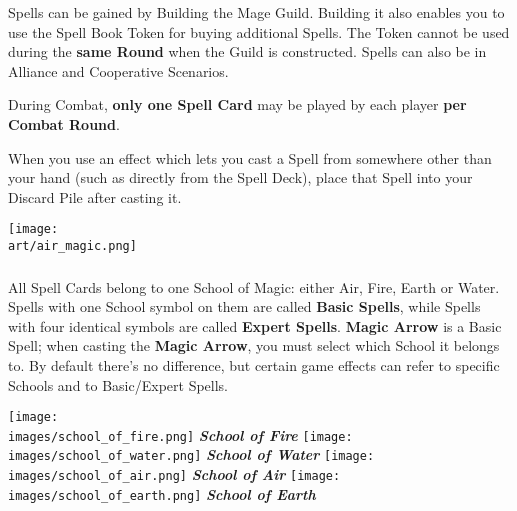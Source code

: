 \begin{multicols*}{2}
Spells can be gained by Building the Mage Guild.
Building it also enables you to use the Spell Book Token for buying additional Spells.
The Token cannot be used during the \textbf{same Round} when the Guild is constructed. Spells can also be  in Alliance and Cooperative Scenarios.

During Combat, \textbf{only one Spell Card} may be played by each player \textbf{per Combat Round}.

\columnbreak
When you use an effect which lets you cast a Spell from somewhere other than your hand (such as directly from the Spell Deck), place that Spell into your Discard Pile after casting it.

\begin{center}
  \vspace*{\fill}
  {\texttt{[image: \\art/air\_magic.png]}}
  \vspace*{\fill}
\end{center}

\subsubsection*{}
All Spell Cards belong to one School of Magic: either Air, Fire, Earth or Water.
Spells with one School symbol on them are called \textbf{Basic Spells}, while Spells with four identical symbols are called \textbf{Expert Spells}.
\textbf{Magic Arrow} is a Basic Spell; when casting the \textbf{Magic Arrow}, you must select which School it belongs to.
By default there's no difference, but certain game effects can refer to specific Schools and to Basic/Expert Spells.

\begin{minipage}[t]{0.48\textwidth}
  \centering
    \centering
    \texttt{[image: \\images/school\_of\_fire.png]}
    \textit{\textbf{\textcolor{darkcandyapplered}{School of Fire}}}
  \endminipage
    \centering
    \texttt{[image: \\images/school\_of\_water.png]}
    \textit{\textbf{\textcolor{darkcandyapplered}{School of Water}}}
  \endminipage
  \hfill\allowbreak%
  \bigbreak
    \centering
    \texttt{[image: \\images/school\_of\_air.png]}
    \textit{\textbf{\textcolor{darkcandyapplered}{School of Air}}}
  \endminipage
    \centering
    \texttt{[image: \\images/school\_of\_earth.png]}
    \textit{\textbf{\textcolor{darkcandyapplered}{School of Earth}}}
  \endminipage
  \bigbreak
\end{minipage}
\clearpage


\end{multicols*}
